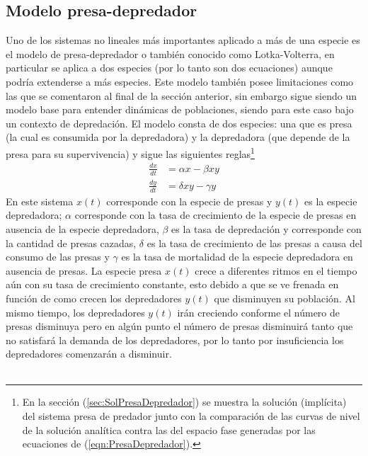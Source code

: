 \subsection{Modelo presa-depredador}

Uno de los sistemas no lineales más importantes aplicado a más de una especie es el modelo de presa-depredador o también conocido como Lotka-Volterra, en particular se aplica a dos especies (por lo tanto son dos ecuaciones) aunque podría extenderse a más especies. Este modelo también posee limitaciones como las que se comentaron al final de la sección anterior, sin embargo sigue siendo un modelo base para entender dinámicas de poblaciones, siendo para este caso bajo un contexto de depredación. El modelo consta de dos especies: una que es presa (la cual es consumida por la depredadora) y la depredadora (que depende de la presa para su supervivencia) y sigue las siguientes reglas\footnote{En la sección (\ref{sec:SolPresaDepredador}) se muestra la solución (implícita) del sistema presa de predador junto con la comparación de las curvas de nivel de la solución analítica contra las del espacio fase generadas por las ecuaciones de (\ref{eqn:PresaDepredador}).}
\begin{equation}\label{eqn:PresaDepredador}
	\begin{split}
		\frac{dx}{dt} &= \alpha x - \beta xy\\
		\frac{dy}{dt} &= \delta xy -\gamma y
	\end{split}
\end{equation}
En este sistema $x(t)$ corresponde con la especie de presas y $y(t)$ es la especie depredadora; $\alpha$ corresponde con la tasa de crecimiento de la especie de presas en ausencia de la especie depredadora, $\beta$ es la tasa de depredación y corresponde con la cantidad de presas cazadas, $\delta$ es la tasa de crecimiento de las presas a causa del consumo de las presas y $\gamma$ es la tasa de mortalidad de la especie depredadora en ausencia de presas. La especie presa $x(t)$ crece a diferentes ritmos en el tiempo aún con su tasa de crecimiento constante, esto debido a que se ve frenada en función de como crecen los depredadores $y(t)$ que disminuyen su población. Al mismo tiempo, los depredadores $y(t)$ irán creciendo conforme el número de presas disminuya pero en algún punto el número de presas disminuirá tanto que no satisfará la demanda de los depredadores, por lo tanto por insuficiencia los depredadores comenzarán a disminuir. \\
\\
